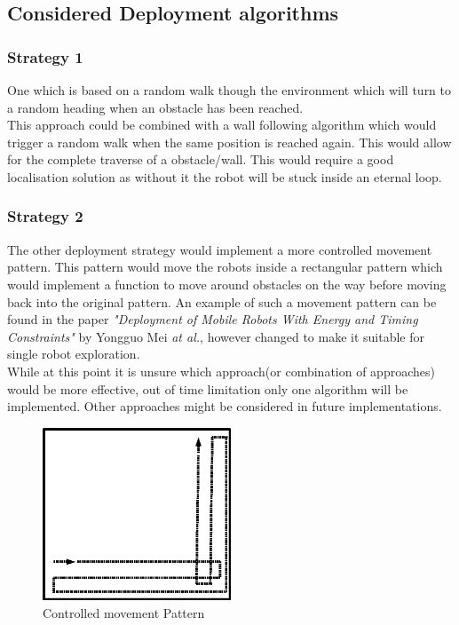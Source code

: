 \subsection{Considered Deployment algorithms}
\subsubsection{Strategy 1}
One which is based on a random walk though the environment which will turn to a random heading when an obstacle has been reached. \\
This approach could be combined with a wall following algorithm which would trigger a random walk when the same position is reached again. This would allow for the complete traverse of a obstacle/wall. This would require a good localisation solution as without it the robot will be stuck inside an eternal loop.\\
\subsubsection{Strategy 2}
The other deployment strategy would implement a more controlled movement pattern. This pattern would move the robots inside a rectangular pattern which would implement a function to move around obstacles on the way before moving back into the original pattern. An example of such a movement pattern can be found in the paper \textit{"Deployment of Mobile Robots With Energy and Timing Constraints"} by Yongguo Mei \textit{at al.}\cite{Mei2006Deployment}, however changed to make it suitable for single robot exploration.\\[3ex]

While at this point it is unsure which approach(or combination of approaches) would be more effective, out of time limitation only one algorithm will be implemented. Other approaches might be considered in future implementations. 

\begin{figure}[h]
\centering
\includegraphics[width=0.5\textwidth]{../../figures/movement_pattern.png} 
\caption{Controlled movement Pattern}
\label{Figure 3}
\end{figure}

